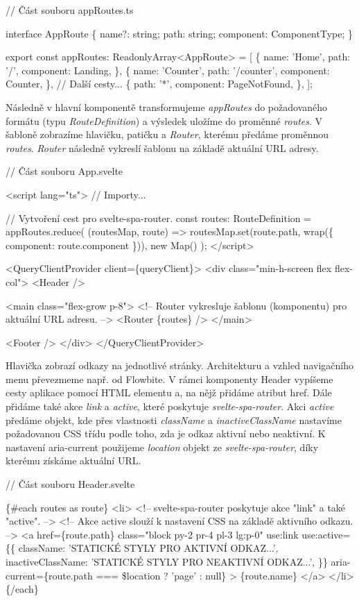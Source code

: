 \begin{prog}
// Část souboru appRoutes.ts

interface AppRoute \{
  name?: string;
  path: string;
  component: ComponentType;
\}

export const appRoutes: ReadonlyArray<AppRoute> = [
  \{
    name: 'Home',
    path: '/',
    component: Landing,
  \},
  \{
    name: 'Counter',
    path: '/counter',
    component: Counter,
  \},
  // Další cesty...
  \{
    path: '*',
    component: PageNotFound,
  \},
];
\end{prog}

Následně v hlavní komponentě transformujeme \emph{appRoutes} do požadovaného formátu (typu \emph{RouteDefinition}) a výsledek uložíme do proměnné \emph{routes}. 
V šabloně zobrazíme hlavičku, patičku a \emph{Router}, kterému předáme proměnnou \emph{routes}. 
\emph{Router} následně vykreslí šablonu na základě aktuální URL adresy.

\begin{prog}
// Část souboru App.svelte

<script lang="ts">
  // Importy...

  // Vytvoření cest pro svelte-spa-router.
  const routes: RouteDefinition = appRoutes.reduce(
    (routesMap, route) => routesMap.set(route.path, wrap(\{
      component: route.component
    \})),
    new Map()
  );
</script>

<QueryClientProvider client=\{queryClient\}>
  <div class="min-h-screen flex flex-col">
    <Header />

    <main class="flex-grow p-8">
      <!-- Router vykresluje šablonu (komponentu) pro aktuální URL adresu. -->
      <Router \{routes\} />
    </main>

    <Footer />
  </div>
</QueryClientProvider>
\end{prog}

Hlavička zobrazí odkazy na jednotlivé stránky. Architekturu a vzhled navigačního menu převezmeme např. od Flowbite. 
V rámci komponenty Header vypíšeme cesty aplikace pomocí HTML elementu a, na nějž přidáme atribut href. 
Dále přidáme také akce \emph{link} a \emph{active}, které poskytuje \emph{svelte-spa-router}. 
Akci \emph{active} předáme objekt, kde přes vlastnosti \emph{className} a \emph{inactiveClassName} nastavíme požadovanou CSS třídu podle toho, zda je odkaz aktivní nebo neaktivní. 
K nastavení aria-current použijeme \emph{location} objekt ze \emph{svelte-spa-router}, díky kterému získáme aktuální URL.

\begin{prog}
// Část souboru Header.svelte

\{#each routes as route\}
  <li>
    <!-- svelte-spa-router poskytuje akce "link" a také "active". -->
    <!-- Akce active slouží k nastavení CSS na základě aktivního odkazu. -->
    <a
      href=\{route.path\}
      class="block py-2 pr-4 pl-3 lg:p-0"
      use:link
      use:active=\{\{
        className: 'STATICKÉ STYLY PRO AKTIVNÍ ODKAZ...',
        inactiveClassName: 'STATICKÉ STYLY PRO NEAKTIVNÍ ODKAZ...',
      \}\}
      aria-current=\{route.path === \$location ? 'page' : null\}
    >
      \{route.name\}
    </a>
  </li>
\{/each\}
\end{prog}


